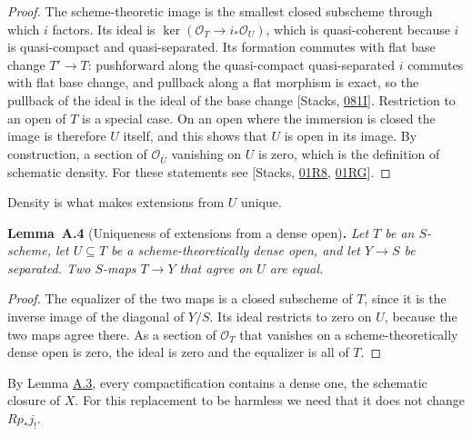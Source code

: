 \documentclass[11pt]{article}
\newenvironment{bpstatement}[2]{\par\addvspace{0.6\baselineskip}\noindent\textbf{#1}#2\textbf{.}\enspace\ignorespaces}
  {\par\addvspace{0.4\baselineskip}}
\newenvironment{bpstatementit}[2]{\begin{bpstatement}{#1}{#2}\itshape\ignorespaces}{\end{bpstatement}}
\begin{document}
\begin{proof}[{Proof}]\label{bp12}%
The scheme-theoretic image is the smallest closed subscheme through which \(i\) factors. Its ideal is \(\ker(\mathcal O_T\to i_*\mathcal O_U)\), which is quasi-coherent because \(i\) is quasi-compact and quasi-separated. Its formation commutes with flat base change \(T'\to T\): pushforward along the quasi-compact quasi-separated \(i\) commutes with flat base change, and pullback along a flat morphism is exact, so the pullback of the ideal is the ideal of the base change [Stacks, \href{https://stacks.math.columbia.edu/tag/081I}{081I}]. Restriction to an open of \(T\) is a special case. On an open where the immersion is closed the image is therefore \(U\) itself, and this shows that \(U\) is open in its image. By construction, a section of \(\mathcal O_{\overline U}\) vanishing on \(U\) is zero, which is the definition of schematic density. For these statements see [Stacks, \href{https://stacks.math.columbia.edu/tag/01R8}{01R8}, \href{https://stacks.math.columbia.edu/tag/01RG}{01RG}].
\end{proof}

\label{bp13}%
Density is what makes extensions from \(U\) unique.

\label{bp14}%
\begin{bpstatementit}{Lemma~A.4}{ (Uniqueness of extensions from a dense open)}
Let \(T\) be an \(S\)-scheme, let \(U\subseteq T\) be a scheme-theoretically dense open, and let \(Y\to S\) be separated. Two \(S\)-maps \(T\to Y\) that agree on \(U\) are equal.
\end{bpstatementit}

\begin{proof}[{Proof}]\label{bp15}%
The equalizer of the two maps is a closed subscheme of \(T\), since it is the inverse image of the diagonal of \(Y/S\). Its ideal restricts to zero on \(U\), because the two maps agree there. As a section of \(\mathcal O_T\) that vanishes on a scheme-theoretically dense open is zero, the ideal is zero and the equalizer is all of \(T\).
\end{proof}

\label{bp16}%
By Lemma \hyperref[bp11]{A.3}, every compactification contains a dense one, the schematic closure of \(X\). For this replacement to be harmless we need that it does not change \(Rp_*j_!\).
\end{document}
